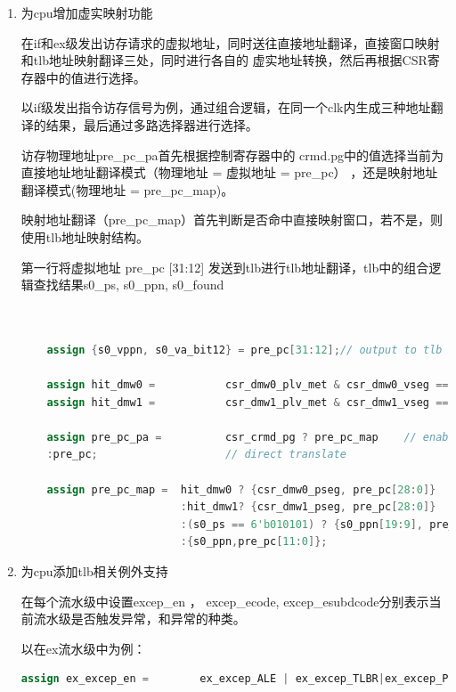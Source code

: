 \documentclass[11pt]{article}
\begin{document}
\begin{enumerate}
  \item 为cpu增加虚实映射功能
  
  在if和ex级发出访存请求的虚拟地址，同时送往直接地址翻译，直接窗口映射和tlb地址映射翻译三处，同时进行各自的
  虚实地址转换，然后再根据CSR寄存器中的值进行选择。

  以if级发出指令访存信号为例，通过组合逻辑，在同一个clk内生成三种地址翻译的结果，最后通过多路选择器进行选择。

  访存物理地址pre\_pc\_pa首先根据控制寄存器中的 crmd.pg中的值选择当前为直接地址地址翻译模式（物理地址 = 虚拟地址 = pre\_pc）
  ，还是映射地址翻译模式(物理地址 = pre\_pc\_map)。

  映射地址翻译（pre\_pc\_map）首先判断是否命中直接映射窗口，若不是，则使用tlb地址映射结构。
  
  第一行将虚拟地址 pre\_pc [31:12] 发送到tlb进行tlb地址翻译，tlb中的组合逻辑查找结果s0\_ps, s0\_ppn, s0\_found
  
  \begin{lstlisting}[language=verilog]


    assign {s0_vppn, s0_va_bit12} = pre_pc[31:12];// output to tlb
                            
    assign hit_dmw0 =           csr_dmw0_plv_met & csr_dmw0_vseg == pre_pc[31:29];
    assign hit_dmw1 =           csr_dmw1_plv_met & csr_dmw1_vseg == pre_pc[31:29];

    assign pre_pc_pa =          csr_crmd_pg ? pre_pc_map    // enable mapping
    :pre_pc;                    // direct translate

    assign pre_pc_map =  hit_dmw0 ? {csr_dmw0_pseg, pre_pc[28:0]}         // dierct map windows 0
                         :hit_dmw1? {csr_dmw1_pseg, pre_pc[28:0]}         // direct map windows 1
                         :(s0_ps == 6'b010101) ? {s0_ppn[19:9], pre_pc[20:0]}   // tlb map: ps 4Mb
                         :{s0_ppn,pre_pc[11:0]};                             // tlb map : ps 4kb
  \end{lstlisting}
  
  \item 为cpu添加tlb相关例外支持
  
  在每个流水级中设置excep\_en ， excep\_ecode, excep\_esubdcode分别表示当前流水级是否触发异常，和异常的种类。

  以在ex流水级中为例：
\begin{lstlisting}[language=verilog]
  assign ex_excep_en =        ex_excep_ALE | ex_excep_TLBR|ex_excep_PIL| ex_excep_PIS| ex_excep_PPI|ex_excep_PME| id_excep_en;


\end{lstlisting}
\end{enumerate}
\end{document}
